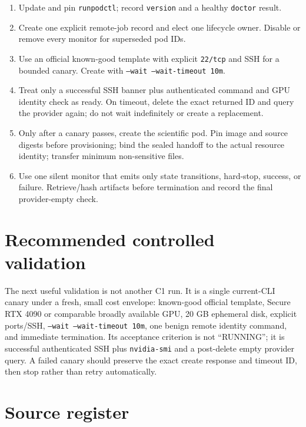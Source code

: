 \documentclass[10pt]{article}
\begin{document}
\begin{enumerate}[leftmargin=1.5em]
\item Update and pin \texttt{runpodctl}; record \texttt{version} and a healthy
  \texttt{doctor} result.
\item Create one explicit remote-job record and elect one lifecycle owner.
  Disable or remove every monitor for superseded pod IDs.
\item Use an official known-good template with explicit \texttt{22/tcp} and
  SSH for a bounded canary.  Create with \texttt{--wait --wait-timeout 10m}.
\item Treat only a successful SSH banner plus authenticated command and GPU
  identity check as ready.  On timeout, delete the exact returned ID and query
  the provider again; do not wait indefinitely or create a replacement.
\item Only after a canary passes, create the scientific pod.  Pin image and
  source digests before provisioning; bind the sealed handoff to the actual
  resource identity; transfer minimum non-sensitive files.
\item Use one silent monitor that emits only state transitions, hard-stop,
  success, or failure.  Retrieve/hash artifacts before termination and record
  the final provider-empty check.
\end{enumerate}

\section*{Recommended controlled validation}

The next useful validation is not another C1 run.  It is a single current-CLI
canary under a fresh, small cost envelope: known-good official template,
Secure RTX 4090 or comparable broadly available GPU, 20 GB ephemeral disk,
explicit ports/SSH, \texttt{--wait --wait-timeout 10m}, one benign remote
identity command, and immediate termination.  Its acceptance criterion is
not ``RUNNING''; it is successful authenticated SSH plus \texttt{nvidia-smi}
and a post-delete empty provider query.  A failed canary should preserve the
exact create response and timeout ID, then stop rather than retry automatically.

\section*{Source register}
\end{document}
